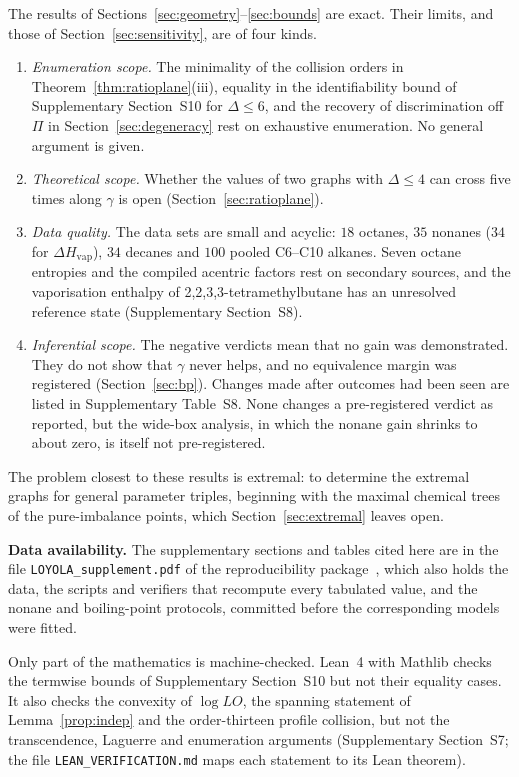\documentclass[a5paper, 10pt]{article}
\theoremstyle{plain}
\theoremstyle{remark}
\theoremstyle{definition}
\begin{document}
The results of Sections~\ref{sec:geometry}--\ref{sec:bounds} are exact.
Their limits, and those of Section~\ref{sec:sensitivity}, are of four
kinds.
\begin{enumerate}
\item[(i)] \emph{Enumeration scope.} The minimality of the collision orders in
Theorem~\ref{thm:ratioplane}(iii), equality in the identifiability
bound of Supplementary Section~S10 for $\Delta \le 6$, and the
recovery of discrimination off $\Pi$ in Section~\ref{sec:degeneracy}
rest on exhaustive enumeration. No general argument is given.
\item[(ii)] \emph{Theoretical scope.} Whether the values of two graphs with $\Delta \le 4$ can cross
five times along $\gamma$ is open (Section~\ref{sec:ratioplane}).
\item[(iii)] \emph{Data quality.} The data sets are small and acyclic: $18$ octanes, $35$
nonanes ($34$ for $\Delta H_{\mathrm{vap}}$), $34$ decanes and $100$ pooled C6--C10 alkanes. Seven octane
entropies and the compiled acentric factors rest on secondary sources,
and the vaporisation enthalpy of 2,2,3,3-tetramethylbutane has an
unresolved reference state (Supplementary Section~S8).
\item[(iv)] \emph{Inferential scope.} The negative verdicts mean that no
gain was demonstrated. They do not show that $\gamma$ never helps, and
no equivalence margin was registered (Section~\ref{sec:bp}). Changes made after outcomes had been seen are listed in
Supplementary Table~S8. None changes a pre-registered verdict as
reported, but the wide-box analysis, in which the nonane gain shrinks
to about zero, is itself not pre-registered.
\end{enumerate}

The problem closest to these results is extremal: to determine the
extremal graphs for general parameter triples, beginning with the
maximal chemical trees of the pure-imbalance points, which
Section~\ref{sec:extremal} leaves open.

\medskip
\noindent\textbf{Data availability.} The supplementary sections and
tables cited here are in the file \texttt{LOYOLA\_supplement.pdf} of the
reproducibility package~\cite{LoyolaRepo}, which also holds the data, the
scripts and verifiers that recompute every tabulated value, and the
nonane and boiling-point protocols, committed before the corresponding
models were fitted.

Only part of the mathematics is machine-checked. Lean~4 with Mathlib
checks the termwise bounds of Supplementary Section~S10 but not their
equality cases. It also checks the convexity of $\log LO$, the spanning
statement of Lemma~\ref{prop:indep} and the order-thirteen profile
collision, but not the transcendence, Laguerre and enumeration arguments
(Supplementary Section~S7; the file \texttt{LEAN\_VERIFICATION.md} maps
each statement to its Lean theorem).
\end{document}
